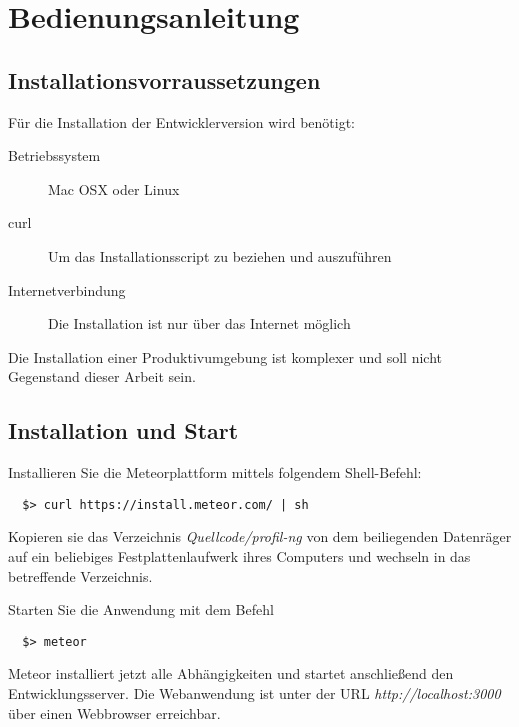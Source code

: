 
\chapter{Bedienungsanleitung} %

\label{ch:bedienungsanleitung} %


\section{Installationsvorraussetzungen}

Für die Installation der Entwicklerversion wird benötigt:

\begin{description}
  \item[Betriebssystem]{Mac OSX oder Linux}
  \item[curl]{Um das Installationsscript zu beziehen und auszuführen}
  \item[Internetverbindung]{Die Installation ist nur über das Internet möglich}
\end{description}

Die Installation einer Produktivumgebung ist komplexer und soll nicht Gegenstand
dieser Arbeit sein.

\section{Installation und Start}

Installieren Sie die Meteorplattform mittels folgendem Shell-Befehl:

\begin{verbatim}
  $> curl https://install.meteor.com/ | sh
\end{verbatim}

Kopieren sie das Verzeichnis \textit{Quellcode/profil-ng} von dem beiliegenden
Datenräger auf ein beliebiges Festplattenlaufwerk ihres Computers und wechseln
in das betreffende Verzeichnis.

Starten Sie die Anwendung mit dem Befehl

\begin{verbatim}
  $> meteor
\end{verbatim}

Meteor installiert jetzt alle Abhängigkeiten und startet anschließend den
Entwicklungsserver. Die Webanwendung ist unter der URL
\textit{http://localhost:3000} über einen Webbrowser erreichbar.


